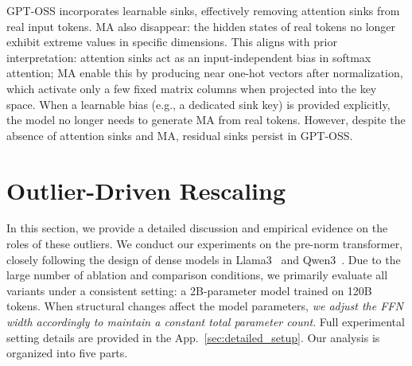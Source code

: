 \documentclass{article} %
\begin{document}
GPT-OSS incorporates learnable sinks, effectively removing attention sinks from real input tokens. 
MA also disappear: the hidden states of real tokens no longer exhibit extreme values in specific dimensions.
This aligns with prior interpretation: attention sinks act as an input-independent bias in softmax attention; MA enable this by producing near one-hot vectors after normalization, which activate only a few fixed matrix columns when projected into the key space.
When a learnable bias (e.g., a dedicated sink key) is provided explicitly, the model no longer needs to generate MA from real tokens.
However, despite the absence of attention sinks and MA, residual sinks persist in GPT-OSS. 

\section{Outlier-Driven Rescaling}

In this section, we provide a detailed discussion and empirical evidence on the roles of these outliers. 
We conduct our experiments on the pre-norm transformer, closely following the design of dense models in Llama3~\citep{dubey2024llama} and Qwen3~\cite{yang2025qwen3}. 
Due to the large number of ablation and comparison conditions, we primarily evaluate all variants under a consistent setting: a 2B-parameter model trained on 120B tokens.
When structural changes affect the model parameters, \textit{we adjust the FFN width accordingly to maintain a constant total parameter count}.
Full experimental setting details are provided in the App.~\ref{sec:detailed_setup}.
Our analysis is organized into five parts.
\end{document}
